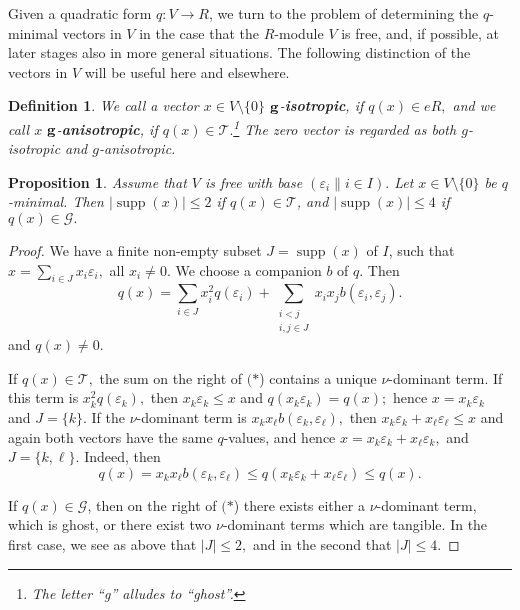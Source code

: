 \documentclass [12pt,a4paper,reqno]{amsart}
\newtheorem{prop}[thm]{Proposition}
\newtheorem{defn}[thm]{Definition}
\begin{document}
Given a quadratic form $q:V\to R$, we turn to the problem of determining the $q$-minimal vectors in $V$ in the case that the $R$-module
$V$ is free, and, if possible, at later stages also in more general situations. The following distinction of the
vectors in $V$ will be useful here and elsewhere.

\begin{defn}\label{defn:II.9.3}
We call a vector $x\in V{\setminus}\{0\}$ $\bf g$-{\textbf{{isotropic}}}, if $q(x)\in eR,$ and we call $x$ $\bf g$-{\textbf{{anisotropic}}},
if $q(x)\in{\mathcal T}.$\footnote{The letter ``g'' alludes to ``ghost''.} The zero vector is regarded as both $g$-isotropic
and $g$-anisotropic.\end{defn}

\begin{prop}\label{prop:II.9.4}
Assume that $V$ is free with base $({\varepsilon}_i  \|i\in I).$ Let $x\in V{\setminus}\{0\}$ be $q$-minimal.
Then $|{\operatorname{supp}}(x)|\le 2$ if
$q(x)\in{\mathcal T}$, and $|{\operatorname{supp}}(x)|\le 4$ if $q(x)\in{\mathcal G}.$
\end{prop}

\begin{proof}
We have a finite non-empty subset $ J ={\operatorname{supp}}(x)$ of $I$, such that $x=\sum\limits_{i\in J }x _i
{\varepsilon}_i,$ all $x _i\ne0.$ We choose a companion $b$ of $q.$ Then
\begin{equation}
q(x)=\sum_{i\in J }x _i^2q({\varepsilon}_i)+\sum_{\substack{i<j\\i,j\in J }}x _ix _j
b({\varepsilon}_i,{\varepsilon}_j).\tag{$\ast$}
\end{equation}
and $q(x)\ne0.$

If $q(x)\in {\mathcal T} ,$ the sum on the right of $(\ast$) contains  a unique $\nu$-dominant term. If this term
is $x ^2_kq({\varepsilon}_k),$ then $x _k{\varepsilon}_k\le x$ and $q(x _k{\varepsilon}_k)=q(x);$ hence $x=x _k{\varepsilon}_k$ and $ J
=\{k\}.$ If the $\nu$-dominant term is $x _kx _\ell b({\varepsilon}_k,{\varepsilon}_\ell),$ then $x _k
{\varepsilon}_k+x _\ell {\varepsilon}_\ell\le x$ and again both vectors have the same $q$-values, and hence $x=x _k{\varepsilon}_k+x _\ell
{\varepsilon}_k,$ and $ J =\{k,\ell\}.$ Indeed, then
$$ q(x) = x_k x_\ell b({\varepsilon}_k, {\varepsilon}_\ell) \leq q(x_k {\varepsilon}_k +  x_\ell {\varepsilon}_\ell) \leq q(x).$$

If $q(x)\in{\mathcal G}$, then on the right of $(\ast$) there exists either a $\nu$-dominant term, which is ghost,
or there exist two $\nu$-dominant terms which are tangible. In the first case, we see as above that $| J |
\le 2,$ and in the second that $| J |\le 4.$
\end{proof}
\end{document}

